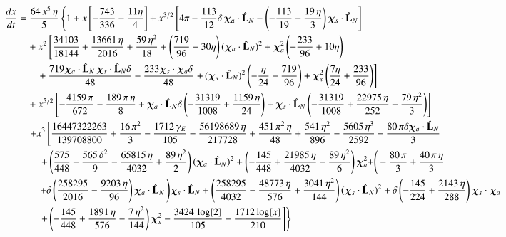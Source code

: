 \documentclass[prd,preprintnumbers,twocolumn,eqsecnum,floatfix,letter]{revtex4}
\begin{document}
% 
\begin{widetext}
\begin{align}\label{eq:FbydE}
\frac{dx}{dt} & = \frac{64\, x^5  \, \eta}{5} \left\{1 + x \left[-\frac{743}{336}-\frac{11 \eta }{4} \right] 
    + x^{3/2} \left[4 \pi-\frac{113}{12}\delta \, \bm{\chi}_a \cdot \hat{\mathbf{L}}_N- \left(-\frac{113}{19} + \frac{19 \, \eta}{3}  \right)\bm{\chi}_s \cdot \hat{\mathbf{L}}_N \right] \right. \nonumber \\ 
    &\quad + x^2 \left[ \frac{34103}{18144} + \frac{13661 \, \eta}{2016} + \frac{59 \, \eta^2}{18} + \left( \frac{719}{96}- 30 \eta\right)(\bm{\chi}_a \cdot \hat{\mathbf{L}}_N)^2 +\bm{\chi}_a^2 \left(-\frac{233}{96}+10 \eta \right) \right. \nonumber\\
   &\qquad+\frac{719 \bm{\chi}_a \cdot \hat{\mathbf{L}}_N \, \bm{\chi}_s \cdot \hat{\mathbf{L}}_N \delta
   }{48}-\frac{233 \bm{\chi}_s \cdot \bm{\chi}_a \delta}{48} \left. + \, (\bm{\chi}_s \cdot \hat{\mathbf{L}}_N)^2 \left(-\frac{\eta }{24}-\frac{719}{96}\right)+\bm{\chi}_s^2 \left(\frac{7 \eta
   }{24}+\frac{233}{96}\right) \right] \nonumber \\ 
    &\quad + x^{5/2} \left[-\frac{4159 \, \pi}{672}-\frac{189 \, \pi \, \eta}{8} + \bm{\chi}_a \cdot \hat{\mathbf{L}}_N \delta  \left(-\frac{31319}{1008} + \frac{1159 \, \eta}{24}\right)+\bm{\chi}_s \cdot \hat{\mathbf{L}}_N \left(-\frac{31319}{1008} + \frac{22975 \, \eta}{252} -\frac{79 \, \eta^2}{3}\right) \right]  \nonumber\\ 
    &\quad \left. + x^3 \left[\frac{16447322263}{139708800} + \frac{16 \, \pi^2}{3} -\frac{1712 \, \gamma_{E}}{105} -\frac{56198689 \, \eta}{217728} + \frac{451 \, \pi^2 \, \eta}{48} + \frac{541 \, \eta^2}{896} -\frac{5605 \, \eta^{3}}{2592} -\frac{80 \,\pi \delta\bm{\chi}_a \cdot \hat{\mathbf{L}}_N }{3} \right.\right. \nonumber \\
    &\qquad \left.\left. + \left(\frac{575}{448} + \frac{565 \, \delta^2}{9}-\frac{65815 \, \eta}{4032} + \frac{89 \, \eta^2}{2}\right)(\bm{\chi}_a \cdot \hat{\mathbf{L}}_N)^2 + \left(-\frac{145}{448}+\frac{21985 \,\eta}{4032} -\frac{89 \, \eta^2}{6}\right)\bm{\chi}_a^2 + \right(-\frac{80 \, \pi}{3} + \frac{40 \, \pi \, \eta}{3} \right. \nonumber \\
    &\qquad  \left.+\delta\left(\frac{258295}{2016} -\frac{9203 \, \eta}{96}\right)\bm{\chi}_a \cdot \hat{\mathbf{L}}_N\left)\bm{\chi}_s \cdot \hat{\mathbf{L}}_N + \left(\frac{258295}{4032} -\frac{48773 \, \eta}{576} + \frac{3041 \, \eta^2}{144}\right)(\bm{\chi}_s \cdot \hat{\mathbf{L}}_N)^2 + \delta\left(-\frac{145}{224} + \frac{2143 \, \eta}{288}\right)\bm{\chi}_s \cdot \bm{\chi}_a \right.\right.\nonumber \\ 
    &\qquad\left.\left.+\left(-\frac{145}{448} + \frac{1891 \, \eta}{576} -\frac{7 \, \eta^2}{144}\right)\bm{\chi}_s^2 - \frac{3424 \, \log[2]}{105} - \frac{1712 \log[x]}{210}\right]\right\}
\end{align}
\end{widetext}
\end{document}

